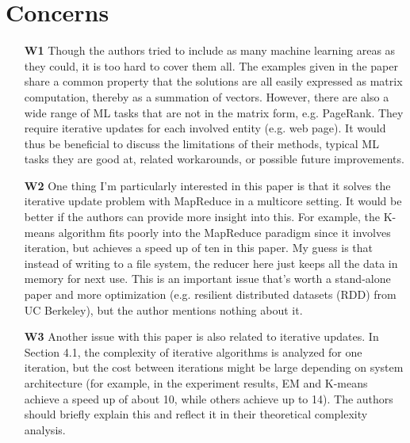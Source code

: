 \documentclass[a4paper]{article}
\begin{document}
\section*{Concerns}
\begin{itemize}
\item[\textbf{W1}] 
Though the authors tried to include as many machine learning areas as they could, it is too hard
to cover them all. The examples given in the paper share a common property that the solutions
are all easily expressed as matrix computation, thereby as a summation of vectors. However, there
are also a wide range of ML tasks that are not in the matrix form, e.g. PageRank. They require
iterative updates for each involved entity (e.g. web page). It would thus be beneficial to discuss the
limitations of their methods, typical ML tasks they are good at, related workarounds, or possible
future improvements.

\item[\textbf{W2}]
One thing I'm particularly interested in this paper is that it solves the iterative update problem with
MapReduce in a multicore setting. It would be better if the authors can provide more insight into
this. For example, the K-means algorithm fits poorly into the MapReduce paradigm since it involves
iteration, but achieves a speed up of ten in this paper. My guess is that instead of writing to a file
system, the reducer here just keeps all the data in memory for next use. This is an important issue
that's worth a stand-alone paper and more optimization (e.g. resilient distributed datasets (RDD)
from UC Berkeley), but the author mentions nothing about it.

\item[\textbf{W3}]
Another issue with this paper is also related to iterative updates. In Section 4.1, the complexity
of iterative algorithms is analyzed for one iteration, but the cost between iterations might be large
depending on system architecture (for example, in the experiment results, EM and K-means achieve
a speed up of about 10, while others achieve up to 14). The authors should briefly
 explain this and reflect it in their theoretical complexity analysis.
\end{itemize}
\end{document}
